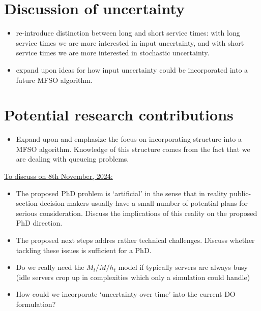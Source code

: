 \documentclass[12pt,a4paper]{article}
\begin{document}
\section{Discussion of uncertainty} \label{uncert}
%
\begin{itemize}[noitemsep]
\item re-introduce distinction between long and short service times: with long service times we are more interested in input uncertainty, and with short service times we are more interested in stochastic uncertainty.
\item expand upon ideas for how input uncertainty could be incorporated into a future MFSO algorithm.
\end{itemize}
%
\section{Potential research contributions} \label{mfso}
\begin{itemize}
\item Expand upon and emphasize the focus on incorporating structure into a MFSO algorithm. Knowledge of this structure comes from the fact that we are dealing with queueing problems.
\end{itemize}
%
\underline{To discuss on 8th November, 2024:}
\begin{itemize}[noitemsep]
\item The proposed PhD problem is `artificial' in the sense that in reality public-section decision makers usually have a small number of potential plans for serious consideration. Discuss the implications of this reality on the proposed PhD direction.
\item The proposed next steps addres rather technical challenges. Discuss whether tackling these issues is sufficient for a PhD.
\item Do we really need the $M_t/M/h_t$ model if typically servers are always busy (idle servers crop up in complexities which only a simulation could handle)
\item How could we incorporate `uncertainty over time' into the current DO formulation?
\end{itemize}
%
\end{document}
